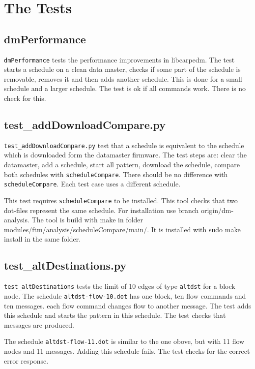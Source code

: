 \documentclass[12pt,a4paper]{report}
\begin{document}
\begin{table}
\end{table}
\chapter{The Tests}
\section{dmPerformance}
\texttt{dmPerformance} tests the performance improvements in libcarpedm.
The test starts a schedule on a clean data master, checks if some part of
the schedule is removable, removes it and then adds another schedule.
This is done for a small schedule and a larger schedule. The test is ok
if all commands work. There is no check for this.

\section{test\_addDownloadCompare.py}
\texttt{test\_addDownloadCompare.py} test that a schedule is equivalent
to the schedule which is downloaded form the datamaster firmware.
The test steps are: clear the datamaster, add a schedule, start all
pattern, download the schedule, compare both schedules with
\texttt{scheduleCompare}. There should be no difference with
\texttt{scheduleCompare}. Each test case uses a different schedule.

This test requires \texttt{scheduleCompare} to be installed. This tool
checks that two dot-files represent the same schedule. For installation
use branch origin/dm-analysis. The tool is build with make in folder
modules/ftm/analysis/scheduleCompare/main/. It is installed with sudo
make install in the same folder.

\section{test\_altDestinations.py}
\texttt{test\_altDestinations} tests the limit of 10 edges of type
\texttt{altdst} for a block node.
The schedule \texttt{altdst-flow-10.dot} has one block, ten flow commands
and ten messages. each flow command changes flow to another message.
The test adds this schedule and starts the pattern in this schedule.
The test checks that messages are produced.

The schedule \texttt{altdst-flow-11.dot} is similar to the one obove,
but with 11 flow nodes and 11 messages. Adding this schedule fails.
The test checks for the correct error response.
\end{document}
